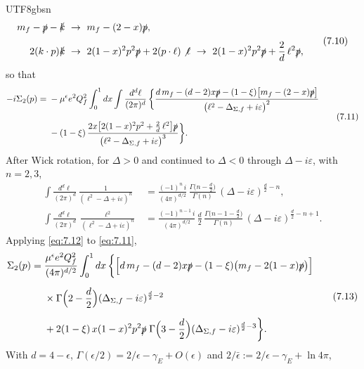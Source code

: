\documentclass[11pt,a4paper,oneside]{report}
\begin{document}
\begin{CJK*}{UTF8}{gbsn}
\begin{equation*}
\begin{aligned}
m_f-\slashed{p}-\slashed{k}\ &\to\ m_f-(2-x)\slashed{p},\\[4pt]
2(k\cdot p)\slashed{k}\ &\to\ 2(1-x)^2p^2\slashed{p}+2(p\cdot\ell)\not\ell
\ \to\ 2(1-x)^2p^2\slashed{p}+\frac2d\,\ell^2\slashed{p},
\end{aligned}
\tag{7.10}\label{eq:7.10}
\end{equation*}
so that
\begin{equation*}
\begin{aligned}
-i\Sigma_2(p)
={}&-\mu^{\epsilon}e^2Q_f^2\int_0^1dx\int\frac{d^d\ell}{(2\pi)^d}\,\biggl\{
\frac{d\,m_f-(d-2)x\slashed{p}-(1-\xi)\bigl[m_f-(2-x)\slashed{p}\bigr]}{\bigl(\ell^2-\Delta_{\Sigma,f}+i\varepsilon\bigr)^2}\\[6pt]
&-(1-\xi)\,\frac{2x\bigl[2(1-x)^2p^2+\frac2d\,\ell^2\bigr]\slashed{p}}{\bigl(\ell^2-\Delta_{\Sigma,f}+i\varepsilon\bigr)^3}\biggr\}.
\end{aligned}
\tag{7.11}\label{eq:7.11}
\end{equation*}
After Wick rotation, for $\Delta>0$ and continued to $\Delta<0$ through $\Delta-i\varepsilon$, with $n=2,3$,
\begin{equation*}
\begin{aligned}
\int\frac{d^d\ell}{(2\pi)^d}\,\frac{1}{(\ell^2-\Delta+i\varepsilon)^n}
&=\frac{(-1)^n\,i}{(4\pi)^{d/2}}\,\frac{\Gamma\bigl(n-\frac d2\bigr)}{\Gamma(n)}\,(\Delta-i\varepsilon)^{\frac d2-n},\\[6pt]
\int\frac{d^d\ell}{(2\pi)^d}\,\frac{\ell^2}{(\ell^2-\Delta+i\varepsilon)^n}
&=\frac{(-1)^{n-1}\,i}{(4\pi)^{d/2}}\,\frac d2\,\frac{\Gamma\bigl(n-1-\frac d2\bigr)}{\Gamma(n)}\,(\Delta-i\varepsilon)^{\frac d2-n+1}.
\end{aligned}
\tag{7.12}\label{eq:7.12}
\end{equation*}
Applying \eqref{eq:7.12} to \eqref{eq:7.11},
\begin{equation*}
\begin{aligned}
\Sigma_2(p)
={}&\frac{\mu^{\epsilon}e^2Q_f^2}{(4\pi)^{d/2}}\int_0^1dx\,\biggl\{
\Bigl[d\,m_f-(d-2)x\slashed{p}-(1-\xi)\bigl(m_f-2(1-x)\slashed{p}\bigr)\Bigr]\\[6pt]
&\times\Gamma\Bigl(2-\frac d2\Bigr)(\Delta_{\Sigma,f}-i\varepsilon)^{\frac d2-2}\\[6pt]
&+2(1-\xi)\,x(1-x)^2p^2\slashed{p}\;
\Gamma\Bigl(3-\frac d2\Bigr)(\Delta_{\Sigma,f}-i\varepsilon)^{\frac d2-3}\biggr\}.
\end{aligned}
\tag{7.13}\label{eq:7.13}
\end{equation*}
With $d=4-\epsilon$, $\Gamma(\epsilon/2)=2/\epsilon-\gamma_E+O(\epsilon)$ and $2/\bar\epsilon:=2/\epsilon-\gamma_E+\ln4\pi$,

\end{CJK*}
\end{document}
